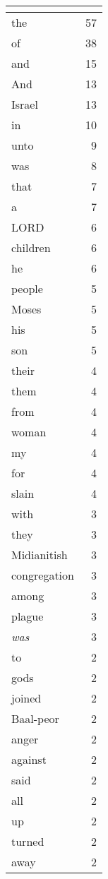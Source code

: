 \begin{center}
\begin{longtable}{l|r}
\hline \multicolumn{2}{c}{{ }} \\ \hline
\endfoot 
the & 57\\ \hline 
of & 38\\ \hline 
and & 15\\ \hline 
And & 13\\ \hline 
Israel & 13\\ \hline 
in & 10\\ \hline 
unto & 9\\ \hline 
was & 8\\ \hline 
that & 7\\ \hline 
a & 7\\ \hline 
LORD & 6\\ \hline 
children & 6\\ \hline 
he & 6\\ \hline 
people & 5\\ \hline 
Moses & 5\\ \hline 
his & 5\\ \hline 
son & 5\\ \hline 
their & 4\\ \hline 
them & 4\\ \hline 
from & 4\\ \hline 
woman & 4\\ \hline 
my & 4\\ \hline 
for & 4\\ \hline 
slain & 4\\ \hline 
with & 3\\ \hline 
they & 3\\ \hline 
Midianitish & 3\\ \hline 
congregation & 3\\ \hline 
among & 3\\ \hline 
plague & 3\\ \hline 
\emph{was} & 3\\ \hline 
to & 2\\ \hline 
gods & 2\\ \hline 
joined & 2\\ \hline 
Baal-peor & 2\\ \hline 
anger & 2\\ \hline 
against & 2\\ \hline 
said & 2\\ \hline 
all & 2\\ \hline 
up & 2\\ \hline 
turned & 2\\ \hline 
away & 2\\ \hline 

\end{longtable}
\end{center}
